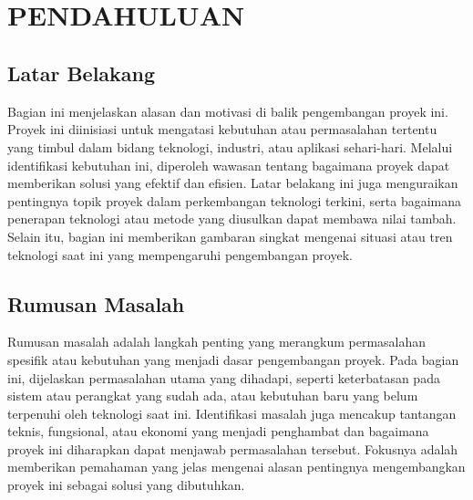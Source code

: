 
\chapter[PENDAHULUAN]{\\ PENDAHULUAN}

\section{Latar Belakang}
Bagian ini menjelaskan alasan dan motivasi di balik pengembangan proyek ini. Proyek ini diinisiasi untuk mengatasi kebutuhan atau permasalahan tertentu yang timbul dalam bidang teknologi, industri, atau aplikasi sehari-hari. Melalui identifikasi kebutuhan ini, diperoleh wawasan tentang bagaimana proyek dapat memberikan solusi yang efektif dan efisien. Latar belakang ini juga menguraikan pentingnya topik proyek dalam perkembangan teknologi terkini, serta bagaimana penerapan teknologi atau metode yang diusulkan dapat membawa nilai tambah. Selain itu, bagian ini memberikan gambaran singkat mengenai situasi atau tren teknologi saat ini yang mempengaruhi pengembangan proyek.

\section{Rumusan Masalah}
Rumusan masalah adalah langkah penting yang merangkum permasalahan spesifik atau kebutuhan yang menjadi dasar pengembangan proyek. Pada bagian ini, dijelaskan permasalahan utama yang dihadapi, seperti keterbatasan pada sistem atau perangkat yang sudah ada, atau kebutuhan baru yang belum terpenuhi oleh teknologi saat ini. Identifikasi masalah juga mencakup tantangan teknis, fungsional, atau ekonomi yang menjadi penghambat dan bagaimana proyek ini diharapkan dapat menjawab permasalahan tersebut. Fokusnya adalah memberikan pemahaman yang jelas mengenai alasan pentingnya mengembangkan proyek ini sebagai solusi yang dibutuhkan.

